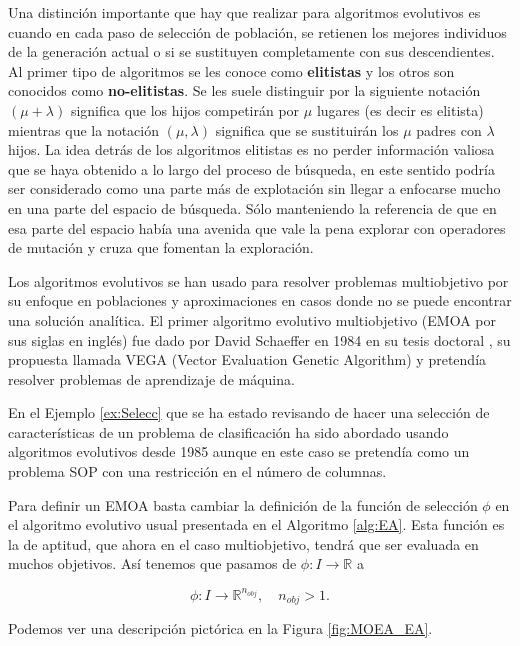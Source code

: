 Una distinción importante que hay que realizar para algoritmos evolutivos es cuando en cada paso de selección de población, se retienen los mejores individuos de la generación actual o si se sustituyen completamente con sus descendientes. Al primer tipo de algoritmos se les conoce como \textbf{elitistas} y los otros son conocidos como \textbf{no-elitistas}. Se les suele distinguir por la siguiente notación $(\mu+\lambda)$ significa que los hijos competirán por $\mu$ lugares (es decir es elitista) mientras que la notación $(\mu,\lambda)$ significa que se sustituirán los $\mu$ padres con $\lambda$ hijos. La idea detrás de los algoritmos elitistas es no perder información valiosa que se haya obtenido a lo largo del proceso de búsqueda, en este sentido podría ser considerado como una parte más de explotación sin llegar a enfocarse mucho en una parte del espacio de búsqueda. Sólo manteniendo la referencia de que en esa parte del espacio había una avenida que vale la pena explorar con operadores de mutación y cruza que fomentan la exploración.
    
Los algoritmos evolutivos se han usado para resolver problemas multiobjetivo por su enfoque en poblaciones y aproximaciones en casos donde no se puede encontrar una solución analítica. El primer algoritmo evolutivo multiobjetivo (EMOA por sus siglas en inglés) fue dado por David Schaeffer en 1984 en su tesis doctoral \cite{schafferMultipleObjectiveOptimization1984}, su propuesta llamada VEGA (Vector Evaluation Genetic Algorithm) y pretendía resolver problemas de aprendizaje de máquina.

En el Ejemplo \ref{ex:Selecc} que se ha estado revisando de hacer una selección de características de un problema de clasificación  ha sido abordado usando algoritmos evolutivos desde 1985 \cite{SIEDLECKI1989335} aunque en este caso se pretendía como un problema SOP con una restricción en el número de columnas. 


Para definir un EMOA basta cambiar la definición de la función de selección $\phi$ en el algoritmo evolutivo usual presentada en el Algoritmo \ref{alg:EA}. Esta función es la de aptitud, que ahora en el caso multiobjetivo, tendrá que ser evaluada en muchos objetivos. Así tenemos que pasamos de $\phi:I\rightarrow \mathbb{R}$ a

$$\phi:I\rightarrow \mathbb{R}^{n_{obj}}, \quad n_{obj}>1.$$


Podemos ver una descripción pictórica en la Figura \ref{fig:MOEA_EA}.

